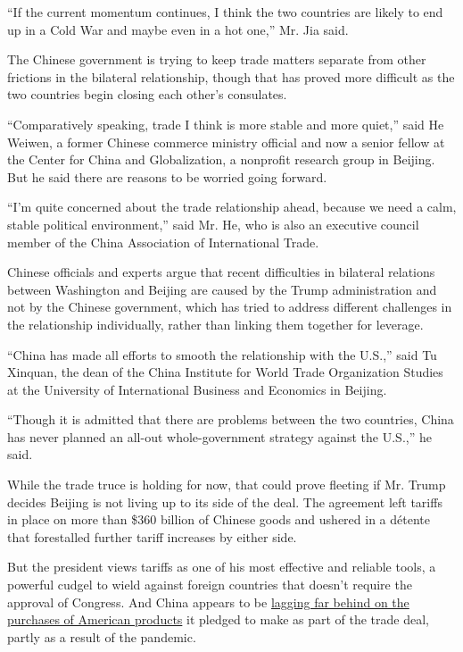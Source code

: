 ``If the current momentum continues, I think the two countries are
likely to end up in a Cold War and maybe even in a hot one,'' Mr. Jia
said.

The Chinese government is trying to keep trade matters separate from
other frictions in the bilateral relationship, though that has proved
more difficult as the two countries begin closing each other's
consulates.

``Comparatively speaking, trade I think is more stable and more quiet,''
said He Weiwen, a former Chinese commerce ministry official and now a
senior fellow at the Center for China and Globalization, a nonprofit
research group in Beijing. But he said there are reasons to be worried
going forward.

``I'm quite concerned about the trade relationship ahead, because we
need a calm, stable political environment,'' said Mr. He, who is also an
executive council member of the China Association of International
Trade.

Chinese officials and experts argue that recent difficulties in
bilateral relations between Washington and Beijing are caused by the
Trump administration and not by the Chinese government, which has tried
to address different challenges in the relationship individually, rather
than linking them together for leverage.

``China has made all efforts to smooth the relationship with the U.S.,''
said Tu Xinquan, the dean of the China Institute for World Trade
Organization Studies at the University of International Business and
Economics in Beijing.

``Though it is admitted that there are problems between the two
countries, China has never planned an all-out whole-government strategy
against the U.S.,'' he said.

While the trade truce is holding for now, that could prove fleeting if
Mr. Trump decides Beijing is not living up to its side of the deal. The
agreement left tariffs in place on more than \$360 billion of Chinese
goods and ushered in a détente that forestalled further tariff increases
by either side.

But the president views tariffs as one of his most effective and
reliable tools, a powerful cudgel to wield against foreign countries
that doesn't require the approval of Congress. And China appears to be
\href{https://www.nytimes.com/2020/06/19/business/economy/trump-china-trade-war-farmers.html}{lagging
far behind on the purchases of American products} it pledged to make as
part of the trade deal, partly as a result of the pandemic.

